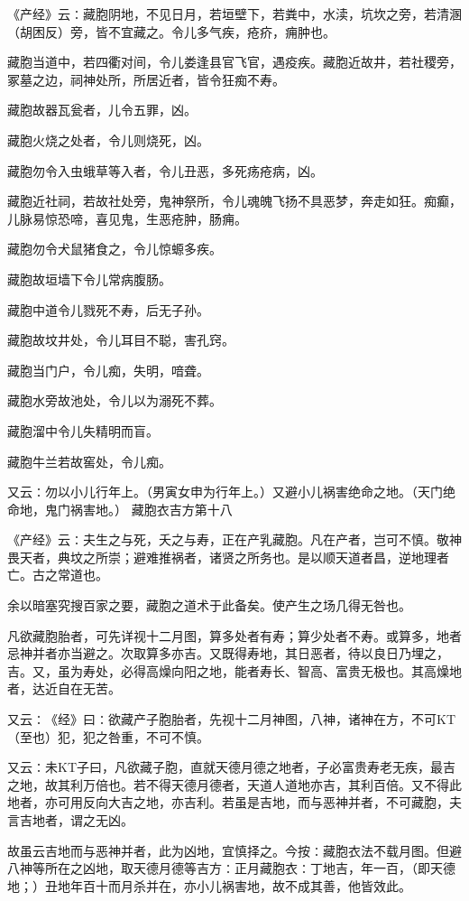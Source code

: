 \documentclass[a4paper,12pt,UTF8,twoside]{ctexbook}
\begin{document}
《产经》云∶藏胞阴地，不见日月，若垣壁下，若粪中，水渎，坑坎之旁，若清溷（胡困反）旁，皆不宜藏之。令儿多气疾，疮疥，痈肿也。

藏胞当道中，若四衢对间，令儿娄逢县官飞官，遇疫疾。藏胞近故井，若社稷旁，冢墓之边，祠神处所，所居近者，皆令狂痴不寿。

藏胞故器瓦瓮者，儿令五罪，凶。

藏胞火烧之处者，令儿则烧死，凶。

藏胞勿令入虫蛾草等入者，令儿丑恶，多死疡疮病，凶。

藏胞近社祠，若故社处旁，鬼神祭所，令儿魂魄飞扬不具恶梦，奔走如狂。痴癫，儿脉易惊恐啼，喜见鬼，生恶疮肿，肠痈。

藏胞勿令犬鼠猪食之，令儿惊螈多疾。

藏胞故垣墙下令儿常病腹肠。

藏胞中道令儿戮死不寿，后无子孙。

藏胞故坟井处，令儿耳目不聪，害孔窍。

藏胞当门户，令儿痴，失明，喑聋。

藏胞水旁故池处，令儿以为溺死不葬。

藏胞溜中令儿失精明而盲。

藏胞牛兰若故窖处，令儿痴。

又云∶勿以小儿行年上。（男寅女申为行年上。）又避小儿祸害绝命之地。（天门绝命地，鬼门祸害地。）
藏胞衣吉方第十八

《产经》云∶夫生之与死，夭之与寿，正在产乳藏胞。凡在产者，岂可不慎。敬神畏天者，典坟之所崇；避难推祸者，诸贤之所务也。是以顺天道者昌，逆地理者亡。古之常道也。

余以暗塞究搜百家之要，藏胞之道术于此备矣。使产生之场几得无咎也。

凡欲藏胞胎者，可先详视十二月图，算多处者有寿；算少处者不寿。或算多，地者忌神并者亦当避之。次取算多亦吉。又既得寿地，其日恶者，待以良日乃埋之，吉。又，虽为寿处，必得高燥向阳之地，能者寿长、智高、富贵无极也。其高燥地者，达近自在无苦。

又云∶《经》曰∶欲藏产子胞胎者，先视十二月神图，八神，诸神在方，不可KT（至也）犯，犯之咎重，不可不慎。

又云∶未KT子曰，凡欲藏子胞，直就天德月德之地者，子必富贵寿老无疾，最吉之地，故其利万倍也。若不得天德月德者，天道人道地亦吉，其利百倍。又不得此地者，亦可用反向大吉之地，亦吉利。若虽是吉地，而与恶神并者，不可藏胞，夫言吉地者，谓之无凶。

故虽云吉地而与恶神并者，此为凶地，宜慎择之。今按∶藏胞衣法不载月图。但避八神等所在之凶地，取天德月德等吉方∶正月藏胞衣∶丁地吉，年一百，（即天德地；）丑地年百十而月杀并在，亦小儿祸害地，故不成其善，他皆效此。
\end{document}
